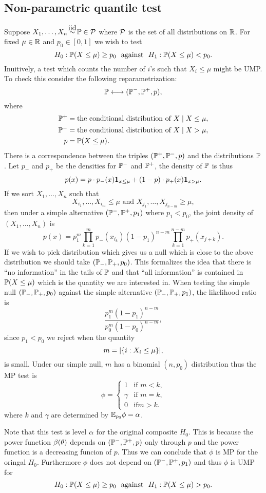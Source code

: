 \subsection{Non-parametric quantile test}
Suppose $X_1,\ldots, X_n \iid \Pa \in \Po$ where ${\mathcal{P}}$ is the set of all distributions on ${\mathbb R}$. For fixed $\mu \in {\mathbb R}$ and $p_0 \in [0,1]$ we wish to test
\[H_0 : {\mathbb{P}}(X \le \mu) \ge p_0 ~~\text{against}~~H_1 : {\mathbb{P}}(X \le \mu) < p_0. \]
Inuitively, a test which counts the number of $i$'s such that $X_i \le \mu$ might be UMP. To check this consider the following reparametrization: 
\[{\mathbb{P}} \longleftrightarrow ({\mathbb{P}}^-, {\mathbb{P}}^+, p), \]
where 
\begin{align*}
    {\mathbb{P}}^+ &= \text{the conditional distribution of } X \mid X \le \mu,\\
    {\mathbb{P}}^- &= \text{the conditional distribution of } X \mid X > \mu,\\
    p     &= {\mathbb{P}}(X \le \mu).
\end{align*}
There is a correspondence between the triples $({\mathbb{P}}^+,{\mathbb{P}}^-,p)$ and the distributions ${\mathbb{P}}$. Let $p_-$ and $p_+$ be the densities for ${\mathbb{P}}^-$ and ${\mathbb{P}}^+$, the density of ${\mathbb{P}}$ is thus 
\[p(x) = p\cdot p_-(x) {{\bf 1}}_{x \le \mu} + (1-p)\cdot p_+(x){{\bf 1}}_{x > \mu}. \]
If we sort $X_1,\ldots, X_n$ such that 
\[X_{i_1},\ldots, X_{i_m} \le \mu \text{ and } X_{j_1},\ldots,X_{j_{n-m}} \ge \mu, \]
then under a simple alternative $({\mathbb{P}}^-, {\mathbb{P}}^+,p_1)$ where $p_1 < p_0$, the joint density of $(X_1,\ldots, X_n)$ is 
\[p(x) = p_1^m \prod_{k=1}^m p_-(x_{i_k}) (1-p_1)^{n-m}\prod_{k=1}^{n-m}p_+(x_{j+k}). \]
If we wish to pick distribution which gives us a null which is close to the above distribution we should take $({\mathbb{P}}_-,{\mathbb{P}}_+,p_0)$. This formalizes the idea that there is ``no information'' in the tails of ${\mathbb{P}}$ and that ``all information'' is contained in ${\mathbb{P}}(X \le \mu)$ which is the quantity we are interested in. When testing the simple null $({\mathbb{P}}_-,{\mathbb{P}}_+,p_0)$ against the simple alternative $({\mathbb{P}}_-,{\mathbb{P}}_+,p_1)$, the likelihood ratio is 
\[ \frac{p_1^m(1-p_1)^{n-m}}{p_0^m(1-p_0)^{n-m}},\]
since $p_1 < p_0$ we reject when the quantity 
\[m = {\left\lvert\{i : X_i \le \mu \}\right\rvert}, \]
is small. Under our simple null, $m$ has a binomial $(n,p_0)$ distribution thus the MP test is 
\[\phi = \begin{cases}
    1& \text{if } m < k,\\
    \gamma&\text{if } m=k,\\
    0 & \text{if} m > k.
\end{cases} \]
where $k$ and $\gamma$ are determined by ${\mathbb{E}}_{p_0}\phi = {\alpha}$. 

Note that this test is level ${\alpha}$ for the original composite $H_0$. This is because the power function $\beta({\theta})$ depends on $({\mathbb{P}}^-, {\mathbb{P}}^+,p)$ only through $p$ and the power function is a decreasing funcion of $p$. Thus we can conclude that $\phi$ is MP for the oringal $H_0$. Furthermore $\phi$ does not depend on $({\mathbb{P}}^-,{\mathbb{P}}^+,p_1)$ and thus $\phi$ is UMP for 
\[H_0 : {\mathbb{P}}(X \le \mu) \ge p_0 ~~\text{against}~~H_1 : {\mathbb{P}}(X \le \mu)>p_0. \]

